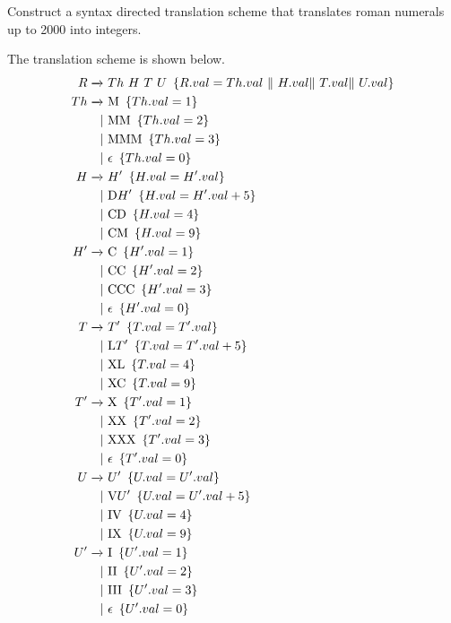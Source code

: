 \begin{exercise}\label{ex:020304}
    Construct a syntax directed translation scheme that translates roman 
    numerals up to 2000 into integers.
\end{exercise}
\begin{solution}\label{sol:020304}
    The translation scheme is shown below.
    \begin{align*}
        R \yld\ &Th\ H\ T\ U\ \cbrak{R.val = Th.val\ \|\ H.val \|\ T.val \|\ U.val} \\
        Th \yld\ &\textrm{M}\ \cbrak{Th.val = 1} \\
              |\ &\textrm{MM}\ \cbrak{Th.val = 2} \\
              |\ &\textrm{MMM}\ \cbrak{Th.val = 3} \\
              |\ &\epsilon\ \cbrak{Th.val = 0} \\
        H \yld\ &H'\ \cbrak{H.val = H'.val} \\
             |\ &\textrm{D}H'\ \cbrak{H.val = H'.val + 5} \\
             |\ &\textrm{CD}\ \cbrak{H.val = 4} \\
             |\ &\textrm{CM}\ \cbrak{H.val = 9} \\
        H' \yld\ &\textrm{C}\ \cbrak{H'.val = 1} \\
              |\ &\textrm{CC}\ \cbrak{H'.val = 2} \\
              |\ &\textrm{CCC}\ \cbrak{H'.val = 3} \\
              |\ &\epsilon\ \cbrak{H'.val = 0} \\
        T \yld\ &T'\ \cbrak{T.val = T'.val} \\
             |\ &\textrm{L}T'\ \cbrak{T.val = T'.val + 5} \\
             |\ &\textrm{XL}\ \cbrak{T.val = 4} \\
             |\ &\textrm{XC}\ \cbrak{T.val = 9} \\
        T' \yld\ &\textrm{X}\ \cbrak{T'.val = 1} \\
              |\ &\textrm{XX}\ \cbrak{T'.val = 2} \\
              |\ &\textrm{XXX}\ \cbrak{T'.val = 3} \\
              |\ &\epsilon\ \cbrak{T'.val = 0} \\
        U \yld\ &U'\ \cbrak{U.val = U'.val} \\
             |\ &\textrm{V}U'\ \cbrak{U.val = U'.val + 5} \\
             |\ &\textrm{IV}\ \cbrak{U.val = 4} \\
             |\ &\textrm{IX}\ \cbrak{U.val = 9} \\
        U' \yld\ &\textrm{I}\ \cbrak{U'.val = 1} \\
              |\ &\textrm{II}\ \cbrak{U'.val = 2} \\
              |\ &\textrm{III}\ \cbrak{U'.val = 3} \\
              |\ &\epsilon\ \cbrak{U'.val = 0}
    \end{align*}
\end{solution}
